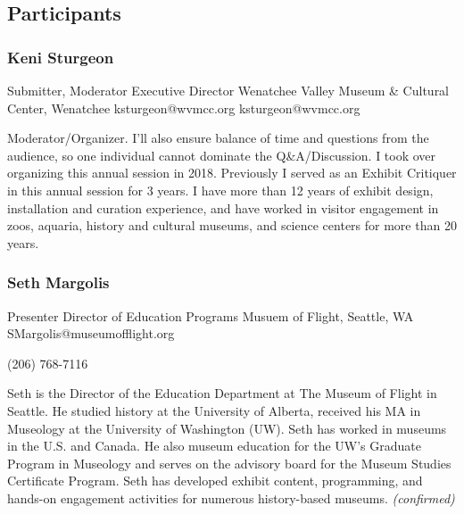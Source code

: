 \documentclass{report}
\begin{document}
            \subsection*{Participants}
              \subsubsection*{ Keni Sturgeon }
              Submitter, Moderator\newline
              Executive Director\newline
              Wenatchee Valley Museum & Cultural Center, Wenatchee
              \newline
              ksturgeon@wvmcc.org\newline
              ksturgeon@wvmcc.org\newline

              Moderator/Organizer. I'll also ensure balance of time and questions from the audience, so one individual cannot dominate the Q\&A/Discussion. I took over organizing this annual session in 2018.  Previously I served as an Exhibit Critiquer in this annual session for 3 years. I have more than 12 years of exhibit design, installation and curation experience, and have worked in visitor engagement in zoos, aquaria, history and cultural museums, and science centers for more than 20 years.\newline


              

              
                \subsubsection*{ Seth  Margolis }
                Presenter\newline
                Director of Education Programs\newline
                Musuem of Flight, Seattle, WA
                \newline
                SMargolis@museumofflight.org\newline
                
                (206) 768-7116\newline

                Seth is the Director of the Education Department at The Museum of Flight in Seattle. He studied history at the University of Alberta, received his MA in Museology at the University of Washington (UW). Seth has worked in museums in the U.S. and Canada. He also museum education for the UW’s Graduate Program in Museology and serves on the advisory board for the Museum Studies Certificate Program. Seth has developed exhibit content, programming, and hands-on engagement activities for numerous history-based museums.
                \emph{ (confirmed) }
              
\end{document}
